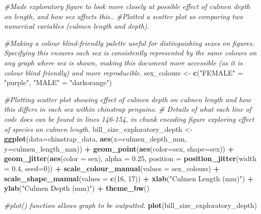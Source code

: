 \documentclass[
]{article}
\newenvironment{Shaded}{\begin{snugshade}}{\end{snugshade}}
\newcommand{\AttributeTok}[1]{\textcolor[rgb]{0.13,0.29,0.53}{#1}}
\newcommand{\CommentTok}[1]{\textcolor[rgb]{0.56,0.35,0.01}{\textit{#1}}}
\newcommand{\DecValTok}[1]{\textcolor[rgb]{0.00,0.00,0.81}{#1}}
\newcommand{\FloatTok}[1]{\textcolor[rgb]{0.00,0.00,0.81}{#1}}
\newcommand{\FunctionTok}[1]{\textcolor[rgb]{0.13,0.29,0.53}{\textbf{#1}}}
\newcommand{\NormalTok}[1]{#1}
\newcommand{\OtherTok}[1]{\textcolor[rgb]{0.56,0.35,0.01}{#1}}
\newcommand{\SpecialCharTok}[1]{\textcolor[rgb]{0.81,0.36,0.00}{\textbf{#1}}}
\newcommand{\StringTok}[1]{\textcolor[rgb]{0.31,0.60,0.02}{#1}}
\begin{document}
\begin{Shaded}
\begin{Highlighting}[]
\CommentTok{\#Made exploratory figure to look more closely at possible effect of culmen depth on length, and how sex affects this..}
\CommentTok{\#Plotted a scatter plot as comparing two numerical variables (culmen length and depth).}

\CommentTok{\#Making a colour blind{-}friendly palette useful for distinguishing sexes on figures. Specifying this ensures each sex is consistently represented by the same colours on any graph where sex is shown, making this document more accessible (as it is colour blind friendly) and more reproducible.}
\NormalTok{sex\_colours }\OtherTok{\textless{}{-}} \FunctionTok{c}\NormalTok{(}\StringTok{"FEMALE"} \OtherTok{=} \StringTok{"purple"}\NormalTok{,}
                 \StringTok{"MALE"} \OtherTok{=} \StringTok{"darkorange"}\NormalTok{)}

\CommentTok{\#Plotting scatter plot showing effect of culmen depth on culmen length and how this differs in each sex within chinstrap penguins. }
\CommentTok{\# Details of what each line of code does can be found in lines 146{-}154, in chunk encoding figure exploring effect of species on culmen length. }
\NormalTok{bill\_size\_exploratory\_depth }\OtherTok{\textless{}{-}} \FunctionTok{ggplot}\NormalTok{(}\AttributeTok{data=}\NormalTok{chinstrap\_data, }
                         \FunctionTok{aes}\NormalTok{(}\AttributeTok{x=}\NormalTok{culmen\_depth\_mm, }
                            \AttributeTok{y=}\NormalTok{culmen\_length\_mm)) }\SpecialCharTok{+} 
                         \FunctionTok{geom\_point}\NormalTok{(}\FunctionTok{aes}\NormalTok{(}\AttributeTok{color=}\NormalTok{sex, }\AttributeTok{shape=}\NormalTok{sex)) }\SpecialCharTok{+} 
                         \FunctionTok{geom\_jitter}\NormalTok{(}\FunctionTok{aes}\NormalTok{(}\AttributeTok{color =}\NormalTok{ sex), }\AttributeTok{alpha =} \FloatTok{0.25}\NormalTok{, }\AttributeTok{position =}                                                                   \FunctionTok{position\_jitter}\NormalTok{(}\AttributeTok{width =} \FloatTok{0.4}\NormalTok{, }\AttributeTok{seed=}\DecValTok{0}\NormalTok{)) }\SpecialCharTok{+}
                         \FunctionTok{scale\_colour\_manual}\NormalTok{(}\AttributeTok{values =}\NormalTok{ sex\_colours) }\SpecialCharTok{+} 
                         \FunctionTok{scale\_shape\_manual}\NormalTok{(}\AttributeTok{values =} \FunctionTok{c}\NormalTok{(}\DecValTok{16}\NormalTok{, }\DecValTok{17}\NormalTok{)) }\SpecialCharTok{+}
                         \FunctionTok{xlab}\NormalTok{(}\StringTok{"Culmen Length (mm)"}\NormalTok{) }\SpecialCharTok{+} 
                         \FunctionTok{ylab}\NormalTok{(}\StringTok{"Culmen Depth (mm)"}\NormalTok{) }\SpecialCharTok{+}
                         \FunctionTok{theme\_bw}\NormalTok{()}

\CommentTok{\#plot() function allows graph to be outputted.}
\FunctionTok{plot}\NormalTok{(bill\_size\_exploratory\_depth)}
\end{Highlighting}
\end{Shaded}
\end{document}
